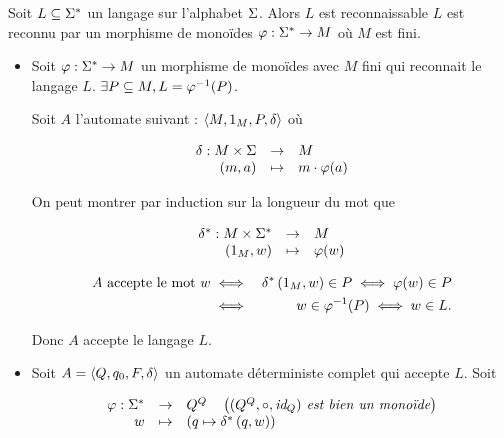 \begin{prop}
	Soit $L \subseteq \Sigma^{*}$ un langage sur l'alphabet $\Sigma$. Alors $L$ est reconnaissable \ssi $L$ est reconnu par un morphisme de monoïdes $\varphi : \Sigma^{*} \to M$ où $M$ est fini.
\end{prop}


\begin{proofI}
	\begin{itemize}
		\item \bimpRL

		      Soit $\varphi : \Sigma^{*} \to M$ un morphisme de monoïdes avec $M$ fini qui reconnait le langage $L$.
		      $\exists P \subseteq M, L = \varphi^{-1} (P)$.

		      Soit $A$ l'automate suivant : $\langle M, 1_M, P, \delta \rangle$ où

		      $$ \begin{array}{rcl}
				      \delta : M \times \Sigma & \to     & M                \\
				      (m,a)                       & \mapsto & m \cdot \varphi (a)
			      \end{array} $$

		      On peut montrer par induction sur la longueur du mot que

		      $$ \begin{array}{rcl}
				      \delta ^* : M \times \Sigma^{*} & \to     & M        \\
				      (1_M, w)                   & \mapsto & \varphi (w)
			      \end{array} $$


		      \begin{eqnarray*}
			      A \text{ accepte le mot } w &\iff&  \delta^{*} \left(1_M,w\right) \in P \iff \varphi (w) \in P \\
			      &\iff&  w \in \varphi^{-1}(P) \iff w \in L.
		      \end{eqnarray*}

		      Donc $A$ accepte le langage $L$.


		\item \bimpLR

		      Soit $A = \langle Q, q_0, F, \delta \rangle$ un automate déterministe complet qui accepte $L$.
		      Soit

		      $$ \begin{array}{rcl}
				      \varphi : \Sigma^{*} & \to     & Q^Q        \quad\left(\textit{$(Q^Q, \circ,\text{id}_Q) $ est bien un monoïde}\right) \\
				      w            & \mapsto & ( q \mapsto \delta^{*} \left(q,w\right) )
			      \end{array} $$


\end{itemize}
\end{proofI}
